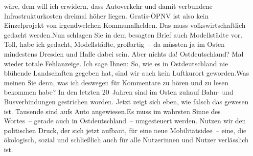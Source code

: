 \documentclass{article}
\begin{document}
wäre, dem will ich erwidern, dass Autoverkehr und damit verbundene Infrastrukturkosten dreimal höher liegen. Gratis-ÖPNV ist also kein Einzelprojekt von irgendwelchen Kommunalhelden. Das muss volkswirtschaftlich gedacht werden.Nun schlagen Sie in dem besagten Brief auch Modellstädte vor. Toll, habe ich gedacht, Modellstädte, großartig – da müssten ja im Osten mindestens Dresden und Halle dabei sein. Aber nichts da! Ostdeutschland? Mal wieder totale Fehlanzeige. Ich sage Ihnen: So, wie es in Ostdeutschland nie blühende Landschaften gegeben hat, sind wir auch kein Luftkurort geworden.Was meinen Sie denn, was ich deswegen für Kommentare zu hören und zu lesen bekommen habe? In den letzten 20 Jahren sind im Osten zuhauf Bahn- und Busverbindungen gestrichen worden. Jetzt zeigt sich eben, wie falsch das gewesen ist. Tausende sind aufs Auto angewiesen.Es muss im wahrsten Sinne des Wortes – gerade auch in Ostdeutschland – umgesteuert werden. Nutzen wir den politischen Druck, der sich jetzt aufbaut, für eine neue Mobilitätsidee – eine, die ökologisch, sozial und schließlich auch für alle Nutzerinnen und Nutzer verlässlich ist.
\end{document}
